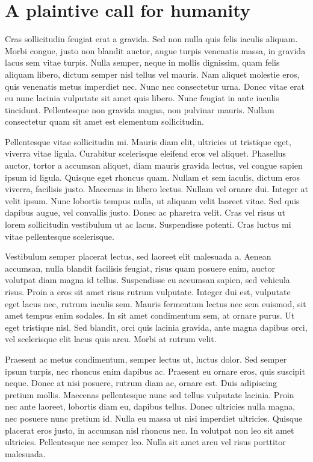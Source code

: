 \documentclass[9pt]{memoir}
\begin{document}
\section{A plaintive call for humanity}
\label{sec:call-for-humanity}
Cras sollicitudin feugiat erat a gravida. Sed non nulla quis felis iaculis aliquam. Morbi congue, justo non blandit auctor, augue turpis venenatis massa, in gravida lacus sem vitae turpis. Nulla semper, neque in mollis dignissim, quam felis aliquam libero, dictum semper nisl tellus vel mauris. Nam aliquet molestie eros, quis venenatis metus imperdiet nec. Nunc nec consectetur urna. Donec vitae erat eu nunc lacinia vulputate sit amet quis libero. Nunc feugiat in ante iaculis tincidunt. Pellentesque non gravida magna, non pulvinar mauris. Nullam consectetur quam sit amet est elementum sollicitudin.

Pellentesque vitae sollicitudin mi. Mauris diam elit, ultricies ut tristique eget, viverra vitae ligula. Curabitur scelerisque eleifend eros vel aliquet. Phasellus auctor, tortor a accumsan aliquet, diam mauris gravida lectus, vel congue sapien ipsum id ligula. Quisque eget rhoncus quam. Nullam et sem iaculis, dictum eros viverra, facilisis justo. Maecenas in libero lectus. Nullam vel ornare dui. Integer at velit ipsum. Nunc lobortis tempus nulla, ut aliquam velit laoreet vitae. Sed quis dapibus augue, vel convallis justo. Donec ac pharetra velit. Cras vel risus ut lorem sollicitudin vestibulum ut ac lacus. Suspendisse potenti. Cras luctus mi vitae pellentesque scelerisque.

Vestibulum semper placerat lectus, sed laoreet elit malesuada a. Aenean accumsan, nulla blandit facilisis feugiat, risus quam posuere enim, auctor volutpat diam magna id tellus. Suspendisse eu accumsan sapien, sed vehicula risus. Proin a eros sit amet risus rutrum vulputate. Integer dui est, vulputate eget lacus nec, rutrum iaculis sem. Mauris fermentum lectus nec sem euismod, sit amet tempus enim sodales. In sit amet condimentum sem, at ornare purus. Ut eget tristique nisl. Sed blandit, orci quis lacinia gravida, ante magna dapibus orci, vel scelerisque elit lacus quis arcu. Morbi at rutrum velit.

Praesent ac metus condimentum, semper lectus ut, luctus dolor. Sed semper ipsum turpis, nec rhoncus enim dapibus ac. Praesent eu ornare eros, quis suscipit neque. Donec at nisi posuere, rutrum diam ac, ornare est. Duis adipiscing pretium mollis. Maecenas pellentesque nunc sed tellus vulputate lacinia. Proin nec ante laoreet, lobortis diam eu, dapibus tellus. Donec ultricies nulla magna, nec posuere nunc pretium id. Nulla eu massa ut nisi imperdiet ultricies. Quisque placerat eros justo, in accumsan nisl rhoncus nec. In volutpat non leo sit amet ultricies. Pellentesque nec semper leo. Nulla sit amet arcu vel risus porttitor malesuada.
\end{document}
